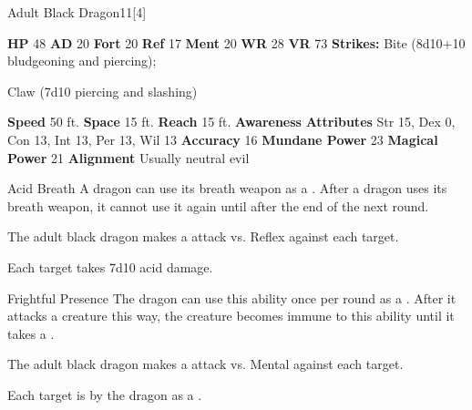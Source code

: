   \begin{monsubsection}{Adult Black Dragon}{11}[4]
    \vspace{-1em}\vspace{-1em}
    \vspace{0em}

    
    

    \begin{spellcontent}
      \begin{spelltargetinginfo}
        \pari \textbf{HP} 48 \monsep
          \textbf{AD} 20 \monsep
          \textbf{Fort} 20 \monsep
          \textbf{Ref} 17 \monsep
          \textbf{Ment} 20
        \pari \textbf{WR} 28 \monsep
        \textbf{VR} 73
        \pari \textbf{Strikes:}
            Bite  (8d10+10 bludgeoning and piercing);
\par Claw  (7d10 piercing and slashing)
      \end{spelltargetinginfo}
    \end{spellcontent}
    \begin{monsterfooter}
      \pari \textbf{Speed} 50 ft. \monsep
        \textbf{Space} 15 ft. \monsep
        \textbf{Reach} 15 ft.
      \pari \textbf{Awareness} 
      \pari \textbf{Attributes}
        Str 15, Dex 0,
        Con 13, Int 13,
        Per 13, Wil 13
      \pari \textbf{Accuracy} 16 \monsep
        \textbf{Mundane Power} 23 \monsep
      \textbf{Magical Power} 21
      \pari \textbf{Alignment} Usually neutral evil
    \end{monsterfooter}
  \end{monsubsection}
  \begin{freeability}{Acid Breath}
      A dragon can use its breath weapon as a .
      After a dragon uses its breath weapon, it cannot use it again until after the end of the next round.
      \par The adult black dragon makes a  attack
        vs. Reflex against each target.
    
    \hit Each target takes 7d10 acid damage.
    \end{freeability}
  

    \begin{freeability}{Frightful Presence}
      The dragon can use this ability once per round as a .
      After it attacks a creature this way, the creature becomes immune to this ability until it takes a .
      \par The adult black dragon makes a  attack
        vs. Mental against each target.
    
    \hit Each target is  by the dragon as a .
    \end{freeability}
  
